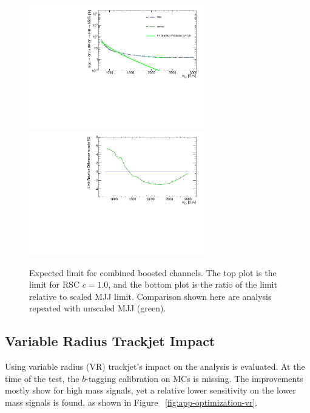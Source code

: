 \begin{figure}[htbp!]
\begin{center}
\includegraphics[width=0.68\textwidth,angle=-90]{figures/boosted/AppendixOptimization/CompareLimits_HH_BoostedNewRun2-pole_c10.pdf}\\
\includegraphics[width=0.68\textwidth,angle=-90]{figures/boosted/AppendixOptimization/CompareLimits_HH_BoostedNewRun2-pole_c10_ratio.pdf}
  \caption{Expected limit for combined boosted channels. The top plot is the limit for RSC $c=1.0$, and the bottom plot is the ratio of the limit relative to scaled MJJ limit. Comparison shown here are analysis repeated with unscaled MJJ (green).}
  \label{fig:app-optimization-polemass}
\end{center}
\end{figure}

\clearpage
\subsection{Variable Radius Trackjet Impact}
\label{sec:app-optimization-vrjet}
Using variable radius (VR) trackjet's impact on the analysis is evaluated. At the time of the test, the $b$-tagging calibration on MCs is missing. The improvements mostly show for high mass signals, yet a relative lower sensitivity on the lower mass signals is found, as shown in Figure ~\ref{fig:app-optimization-vr}.

